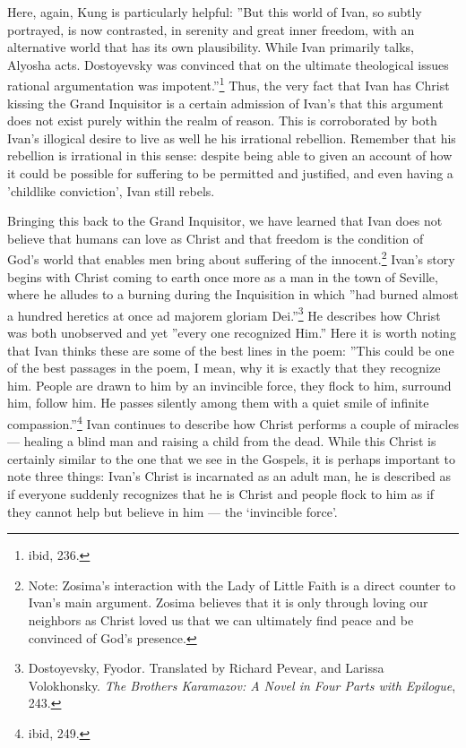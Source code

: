 Here, again, Kung is particularly helpful: ''But this world of Ivan, so subtly portrayed, is now contrasted, in serenity and great inner freedom, with an alternative world that has its own plausibility. While Ivan primarily talks, Alyosha acts. Dostoyevsky was convinced that on the ultimate theological issues rational argumentation was impotent.''\footnote{ibid, 236.}  Thus, the very fact that Ivan has Christ kissing the Grand Inquisitor is a certain admission of Ivan's that this argument does not exist purely within the realm of reason. This is corroborated by both Ivan's illogical desire to live as well he his irrational rebellion. Remember that his rebellion is irrational in this sense: despite being able to given an account of how it could be possible for suffering to be permitted and justified, and even having a 'childlike conviction', Ivan still rebels.

Bringing this back to the Grand Inquisitor, we have learned that Ivan does not believe that humans can love as Christ and that freedom is the condition of God's world that enables men bring about suffering of the innocent.\footnote{Note: Zosima's interaction with the Lady of Little Faith is a direct counter to Ivan's main argument. Zosima believes that it is only through loving our neighbors as Christ loved us that we can ultimately find peace and be convinced of God's presence.} Ivan's story begins with Christ coming to earth once more as a man in the town of Seville, where he alludes to a burning during the Inquisition in which ''had burned almost a hundred heretics at once ad majorem gloriam Dei.''\footnote{Dostoyevsky, Fyodor. Translated by Richard Pevear, and Larissa Volokhonsky. \emph{The Brothers Karamazov: A Novel in Four Parts with Epilogue}, 243.} He describes how Christ was both unobserved and yet ''every one recognized Him.'' Here it is worth noting that Ivan thinks these are some of the best lines in the poem: ''This could be one of the best passages in the poem, I mean, why it is exactly that they recognize him. People are drawn to him by an invincible force, they flock to him, surround him, follow him. He passes silently among them with a quiet smile of infinite compassion.''\footnote{ibid, 249.} Ivan continues to describe how Christ performs a couple of miracles --- healing a blind man and raising a child from the dead. While this Christ is certainly similar to the one that we see in the Gospels, it is perhaps important to note three things: Ivan's Christ is incarnated as an adult man, he is described as if everyone suddenly recognizes that he is Christ and people flock to him as if they cannot help but believe in him --- the `invincible force'.

